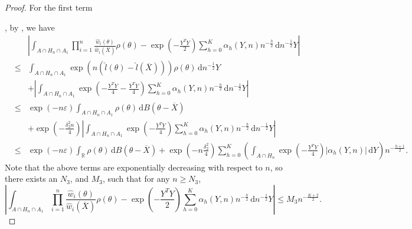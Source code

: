 \documentclass[oneside,english]{amsbook}
\numberwithin{section}{chapter}
\numberwithin{equation}{section}
\numberwithin{figure}{section}
\theoremstyle{plain}
\theoremstyle{plain}
\theoremstyle{definition}
\theoremstyle{plain}
\theoremstyle{plain}
\theoremstyle{remark}
\theoremstyle{definition}
\theoremstyle{definition}
\newcommand{\diff}{\,\mathrm{d}}
\begin{document}
\begin{proof}
For the first term%

, by , we have
\begin{eqnarray*}
 &  & \left|\int_{A\cap H_{n}\cap A_{1}}\prod_{i=1}^{n}\frac{\hat{w}_{i}\left(\theta\right)}{\hat{w}_{i}\left(\overline{X}\right)}\rho\left(\theta\right)-\exp\left(-\frac{Y^{T}Y}{2}\right)\sum_{h=0}^{K}\alpha_{h}\left(Y,n\right)n^{-\frac{h}{2}}\diff n^{-\frac{1}{2}}Y\right|\\
 & \le & \int_{A\cap H_{n}\cap A_{1}}\exp\left(n\left(\hat{l}\left(\theta\right)-\hat{l}\left(\overline{X}\right)\right)\right)\rho\left(\theta\right)\diff n^{-\frac{1}{2}}Y\\
 &  & +\left|\int_{A\cap H_{n}\cap A_{1}}\exp\left(-\frac{Y^{T}Y}{4}-\frac{Y^{T}Y}{4}\right)\sum_{h=0}^{K}\alpha_{h}\left(Y,n\right)n^{-\frac{h}{2}}\diff n^{-\frac{1}{2}}Y\right|\\
 & \le & \exp\left(-n\varepsilon\right)\int_{A\cap H_{n}\cap A_{1}}\rho\left(\theta\right)\diff B\left(\theta-\overline{X}\right)\\
 &  & +\exp\left(-\frac{\delta_{2}^{2}n}{4}\right)\left|\int_{A\cap H_{n}\cap A_{1}}\exp\left(-\frac{Y^{T}Y}{4}\right)\sum_{h=0}^{K}\alpha_{h}\left(Y,n\right)n^{-\frac{h}{2}}\diff n^{-\frac{1}{2}}Y\right|\\
 & \le & \exp\left(-n\varepsilon\right)\int_{\mathbb{R}}\rho\left(\theta\right)\diff B\left(\theta-\overline{X}\right)+\exp\left(-n\frac{\delta_{2}^{2}}{4}\right)\sum_{h=0}^{K}\left(\int_{A\cap H_{n}}\exp\left(-\frac{Y^{T}Y}{4}\right)\left|\alpha_{h}\left(Y,n\right)\right|\diff Y\right)n^{-\frac{h+1}{2}}.
\end{eqnarray*}
Note that the above terms are exponentially decreasing with respect
to $n$, so there exists an $N_{3}$, and $M_{3}$, such that for
any $n\ge N_{3}$, 
\[
\left|\int_{A\cap H_{n}\cap A_{1}}\prod_{i=1}^{n}\frac{\hat{w}_{i}\left(\theta\right)}{\hat{w}_{i}\left(\overline{X}\right)}\rho\left(\theta\right)-\exp\left(-\frac{Y^{T}Y}{2}\right)\sum_{h=0}^{K}\alpha_{h}\left(Y,n\right)n^{-\frac{h}{2}}\diff n^{-\frac{1}{2}}Y\right|\le M_{3}n^{-\frac{K+2}{2}}.
\]



\end{proof}
\end{document}
